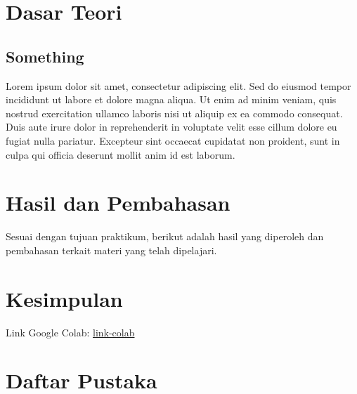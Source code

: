 \documentclass[a4paper,oneside,11pt]{book}
\begin{document}
\section{Dasar Teori}

\subsection{Something}
\par Lorem ipsum dolor sit amet, consectetur adipiscing elit. Sed do eiusmod tempor incididunt ut labore et dolore magna aliqua. Ut enim ad minim veniam, quis nostrud exercitation ullamco laboris nisi ut aliquip ex ea commodo consequat. Duis aute irure dolor in reprehenderit in voluptate velit esse cillum dolore eu fugiat nulla pariatur. Excepteur sint occaecat cupidatat non proident, sunt in culpa qui officia deserunt mollit anim id est laborum.




\section{Hasil dan Pembahasan}

\par Sesuai dengan tujuan praktikum, berikut adalah hasil yang diperoleh dan pembahasan terkait materi yang telah dipelajari.

\section{Kesimpulan}

\par Link Google Colab: {\small\url{link-colab}}

\section{Daftar Pustaka}
\end{document}
